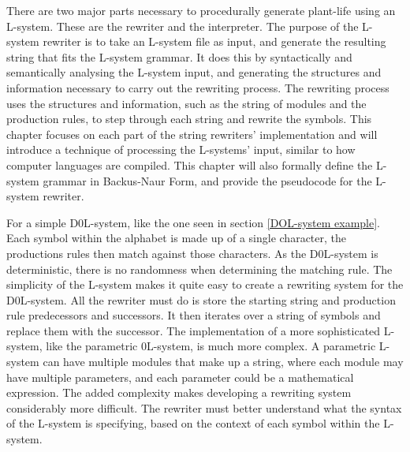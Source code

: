 
\lettrine[lines=3]{T}{}here are two major parts necessary to procedurally generate plant-life using an L-system. These are the rewriter and the interpreter. The purpose of the L-system rewriter is to take an L-system file as input, and generate the resulting string that fits the L-system grammar. It does this by syntactically and semantically analysing the L-system input, and generating the structures and information necessary to carry out the rewriting process. The rewriting process uses the structures and information, such as the string of modules and the production rules, to step through each string and rewrite the symbols. This chapter focuses on each part of the string rewriters' implementation and will introduce a technique of processing the L-systems' input, similar to how computer languages are compiled. This chapter will also formally define the L-system grammar in Backus-Naur Form, and provide the pseudocode for the L-system rewriter. 

For a simple D0L-system, like the one seen in section \ref{DOL-system example}. Each symbol within the alphabet is made up of a single character, the productions rules then match against those characters. As the D0L-system is deterministic, there is no randomness when determining the matching rule. The simplicity of the L-system makes it quite easy to create a rewriting system for the D0L-system. All the rewriter must do is store the starting string and production rule predecessors and successors. It then iterates over a string of symbols and replace them with the successor. The implementation of a more sophisticated L-system, like the parametric 0L-system, is much more complex. A parametric L-system can have multiple modules that make up a string, where each module may have multiple parameters, and each parameter could be a mathematical expression. The added complexity makes developing a rewriting system considerably more difficult. The rewriter must better understand what the syntax of the L-system is specifying, based on the context of each symbol within the L-system.

